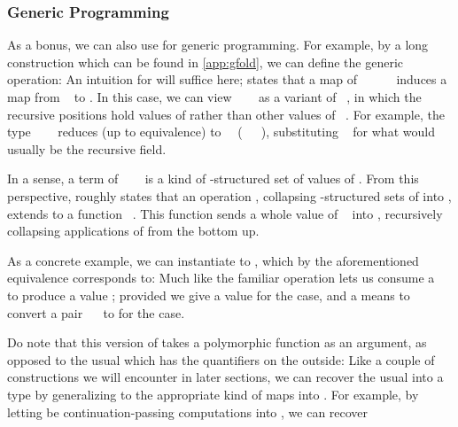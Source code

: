 \subsubsection{Generic Programming}\label{ssec:generic-programming}
As a bonus, we can also use  for generic programming. For example, by a long construction which can be found in \autoref{app:gfold}, we can define the generic  operation:
An intuition for  will suffice here;  states that a map  of \ \ \ \ \  induces a map from \  to . In this case, we can view \ \ \  as a variant of \ , in which the recursive positions hold values of  rather than other values of \ . For example, the type \ \ \  reduces (up to equivalence) to \ \ (\ \ \ ), substituting \  for what would usually be the recursive field.

In a sense, a term of \ \ \  is a kind of -structured set of values of . From this perspective,  roughly states that an operation , collapsing -structured sets of  into , extends to a function \ . This function sends a whole value of \  into , recursively collapsing applications of  from the bottom up.

As a concrete example, we can instantiate  to , which by the aforementioned equivalence corresponds to:
Much like the familiar  operation lets us consume a \  to produce a value ; provided we give a value  for the \AIC{[]} case, and a means to convert a pair \ \  to  for the  case.

Do note that this version of  takes a polymorphic function as an argument, as opposed to the usual  which has the quantifiers on the outside:
Like a couple of constructions we will encounter in later sections, we can recover the usual  into a type  by generalizing  to the appropriate kind of maps into . For example, by letting  be continuation-passing computations into \bN{}, we can recover


